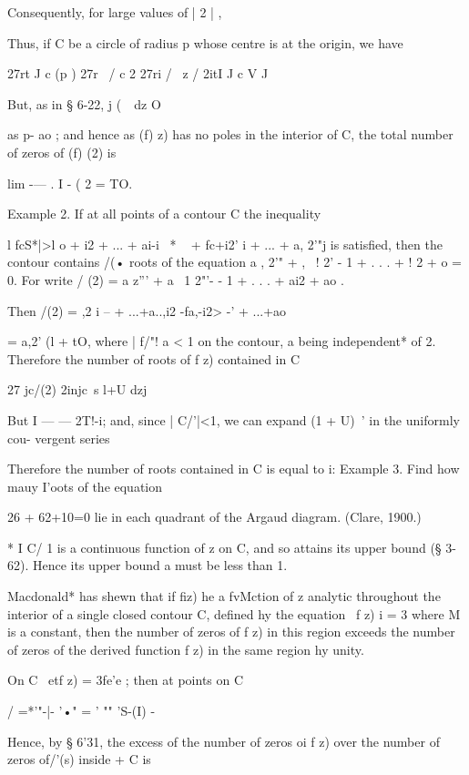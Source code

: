 Consequently, for large values of | 2 | ,

Thus, if C be a circle of radius p whose centre is at the origin, we
have

27rt J c (p ) 27r \ / c 2 27ri / \ z / 2itI J c V J

But, as in § 6-22, j (\ \ dz O

as p- ao ; and hence as (f) z) has no poles in the interior of C, the
total number of zeros of (f) (2) is

lim -— . I - ( 2 = TO.

Example 2. If at all points of a contour C the inequality

l fcS*|>l o + i2 + ... + ai-i~ * ~ + fc+i2' i + ... + a, 2'"j is
satisfied, then the contour contains /(• roots of the equation a , 2'"
+ , \ ! 2' - 1 + . . . + ! 2 + o = 0. For write / (2) = a z''' + a \ 1
2"'- - 1 + . . . + ai2 + ao .

Then /(2) = ,2 i -- + ...+a..,i2 -fa,-i2> -' + ...+ao\

= a,2' (l + tO, where | f/"! a < 1 on the contour, a being
independent* of 2. Therefore the number of roots of f z) contained in
C

27 jc/(2) 2injc\ s l+U dzj

But I — — 2T!-i; and, since | C/'|<1, we can expand (1 + U)~' in the
uniformly cou- vergent series

Therefore the number of roots contained in C is equal to i: Example 3.
Find how mauy I'oots of the equation

26 + 62+10=0 lie in each quadrant of the Argaud diagram. (Clare,
1900.)

* I C/ 1 is a continuous function of z on C, and so attains its upper
bound (§ 3-62). Hence its upper bound a must be less than 1.

%
%


Macdonald* has shewn that if fiz) he a fvMction of z analytic
throughout the interior of a single closed contour C, defined hy the
equation \ f z) i = 3 where M is a constant, then the number of zeros
of f z) in this region exceeds the number of zeros of the derived
function f z) in the same region hy unity.

On C \ etf z) = 3fe'e ; then at points on C

/ =*'"-|- '•" = ' "" 'S-(I) -

Hence, by § 6'31, the excess of the number of zeros oi f z) over the
number of zeros of/'(s) inside + C is


